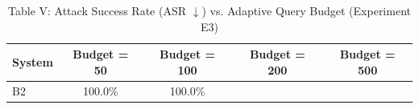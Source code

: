 \begin{table}[t]
\centering
\caption{Table V: Attack Success Rate (ASR $\downarrow$) vs. Adaptive Query Budget (Experiment E3)}
\begin{tabular}{l c c c c}
\hline
\textbf{System} & \textbf{Budget = 50} & \textbf{Budget = 100} & \textbf{Budget = 200} & \textbf{Budget = 500} \\
\hline
B2 & 100.0\% & 100.0\% \\
\hline
\end{tabular}
\end{table}
